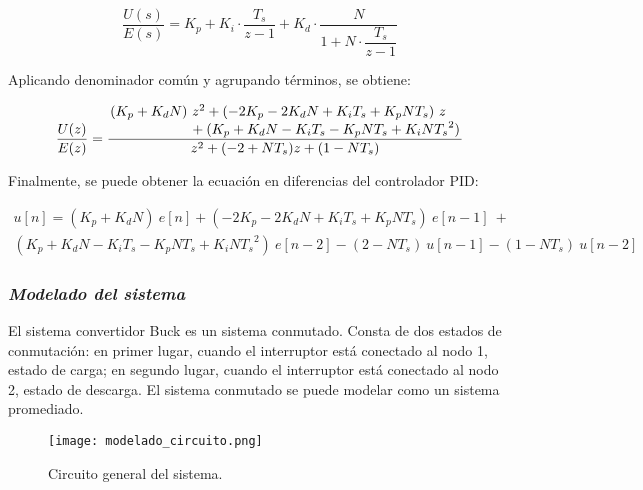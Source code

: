 \vspace{-0.5cm}
\begin{equation}
    \dfrac{U(s)}{E(s)} = K_p + K_i \cdot \dfrac{T_s}{z-1} + K_d \cdot \dfrac{N}{1+N \cdot \dfrac{T_s}{z-1}}
\end{equation}
\vspace{-0.5cm}

Aplicando denominador común y agrupando términos, se obtiene:

\vspace{-0.5cm}
\begin{equation}
    \dfrac{U(z)}{E(z)} =
    \frac
    {
        \splitfrac{
            (K_p + K_d N)\ z^2 + (-2 K_p - 2 K_d N + K_i T_s + K_p N T_s)\ z
        }{
            + (K_p + K_d N - K_i T_s - K_p N T_s + K_i N {T_s}^2)
        }
    }
    {
            z^2 + (-2 + N T_s) z + (1 - N T_s)
    }
    \end{equation}
\vspace{-0.5cm}

Finalmente, se puede obtener la ecuación en diferencias del controlador PID:

\vspace{-0.5cm}
\begin{multline}
        u[n] = (K_p + K_d N)\ e[n] + (-2 K_p - 2 K_d N + K_i T_s + K_p N T_s)\ e[n-1]\  + \\
    (K_p + K_d N - K_i T_s - K_p N T_s + K_i N {T_s}^2)\ e[n-2] - (2 - N T_s)\ u[n-1] - (1 - N T_s)\ u[n-2]
\end{multline}
\vspace{-0.5cm}

\subsubsection*{\it{Modelado del sistema}}
\vspace{-0.25cm}

El sistema convertidor Buck es un sistema conmutado. Consta de dos estados de conmutación: 
en primer lugar, cuando el interruptor está conectado al nodo 1, estado de carga; en segundo lugar, cuando
el interruptor está conectado al nodo 2, estado de descarga.
El sistema conmutado se puede modelar como un sistema promediado.

\begin{figure}[H]
    \centering
    \texttt{[image: modelado\_circuito.png]}
    \vspace{-0.25cm}
    \caption{Circuito general del sistema.}
    \label{fig:modelado_circuito}
\end{figure}

